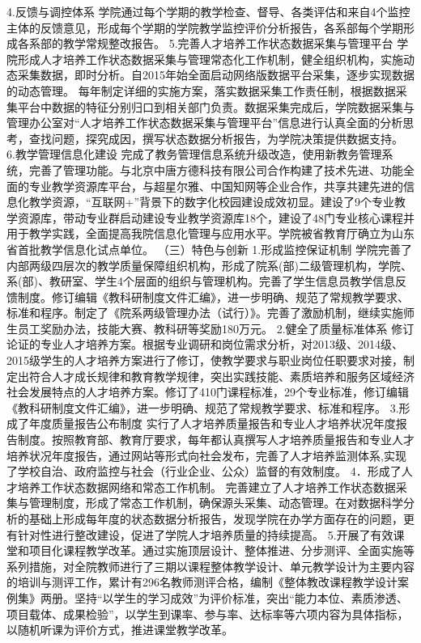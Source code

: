 4.反馈与调控体系
学院通过每个学期的教学检查、督导、各类评估和来自4个监控主体的反馈意见，形成每个学期的学院教学监控评价分析报告，各系部每个学期形成各系部的教学常规整改报告。
5.完善人才培养工作状态数据采集与管理平台
学院形成人才培养工作状态数据采集与管理常态化工作机制，健全组织机构，实施动态采集数据，即时分析。自2015年始全面启动网络版数据平台采集，逐步实现数据的动态管理。
每年制定详细的实施方案，落实数据采集工作责任制，根据数据采集平台中数据的特征分别归口到相关部门负责。数据采集完成后，学院数据采集与管理办公室对“人才培养工作状态数据采集与管理平台”信息进行认真全面的分析思考，查找问题，探究成因，撰写状态数据分析报告，为学院决策提供数据支持。
6.教学管理信息化建设
完成了教务管理信息系统升级改造，使用新教务管理系统，完善了管理功能。与北京中唐方德科技有限公司合作构建了技术先进、功能全面的专业教学资源库平台，与超星尔雅、中国知网等企业合作，共享共建先进的信息化教学资源，“互联网+”背景下的数字化校园建设成效初显。建设了9个专业教学资源库，带动专业群启动建设专业教学资源库18个，建设了48门专业核心课程并用于教学实践，全面提高我院信息化管理与应用水平。学院被省教育厅确立为山东省首批教学信息化试点单位。
（三）特色与创新
1.形成监控保证机制
学院完善了内部两级四层次的教学质量保障组织机构，形成了院系(部)二级管理机构，学院、系(部)、教研室、学生4个层面的组织与管理机构。完善了学生信息员教学信息反馈制度。修订编辑《教科研制度文件汇编》，进一步明确、规范了常规教学要求、标准和程序。制定了《院系两级管理办法（试行）》。完善了激励机制，继续实施师生员工奖励办法，技能大赛、教科研等奖励180万元。
2.健全了质量标准体系
修订论证的专业人才培养方案。根据专业调研和岗位需求分析，对2013级、2014级、2015级学生的人才培养方案进行了修订，使教学要求与职业岗位任职要求对接，制定出符合人才成长规律和教育教学规律，突出实践技能、素质培养和服务区域经济社会发展特点的人才培养方案。修订了410门课程标准，29个专业标准，修订编辑《教科研制度文件汇编》，进一步明确、规范了常规教学要求、标准和程序。
3.形成了年度质量报告公布制度
实行了人才培养质量报告和专业人才培养状况年度报告制度。按照教育部、教育厅要求，每年都认真撰写人才培养质量报告和专业人才培养状况年度报告，通过网站等形式向社会发布，完善了人才培养监测体系,实现了学校自治、政府监控与社会（行业企业、公众）监督的有效制度。
4．形成了人才培养工作状态数据网络和常态工作机制。
完善建立了人才培养工作状态数据采集与管理制度，形成了常态工作机制，确保源头采集、动态管理。在对数据科学分析的基础上形成每年度的状态数据分析报告，发现学院在办学方面存在的问题，更有针对性进行整改建设，促进了学院人才培养质量的持续提高。
5.开展了有效课堂和项目化课程教学改革。通过实施顶层设计、整体推进、分步测评、全面实施等系列措施，对全院教师进行了三期以课程整体教学设计、单元教学设计为主要内容的培训与测评工作，累计有296名教师测评合格，编制《整体教改课程教学设计案例集》两册。坚持“以学生的学习成效”为评价标准，突出“能力本位、素质渗透、项目载体、成果检验”，以学生到课率、参与率、达标率等六项内容为具体指标，以随机听课为评价方式，推进课堂教学改革。
